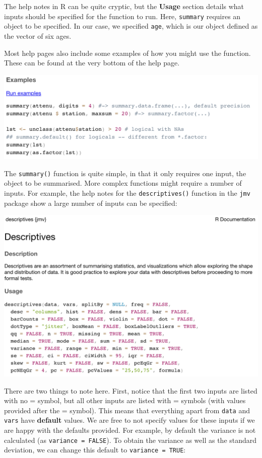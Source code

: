 \documentclass[
]{memoir}
\begin{document}
The help notes in R can be quite cryptic, but the \textbf{Usage} section details what inputs should be specified for the function to run. Here, \texttt{summary} requires an object to be specified. In our case, we specified \texttt{age}, which is our object defined as the vector of six ages.

Most help pages also include some examples of how you might use the function. These can be found at the very bottom of the help page.

\includegraphics[width=0.8\linewidth]{img/help-2}

The \texttt{summary()} function is quite simple, in that it only requires one input, the object to be summarised. More complex functions might require a number of inputs. For example, the help notes for the \texttt{descriptives()} function in the \texttt{jmv} package show a large number of inputs can be specified:

\includegraphics[width=0.8\linewidth]{img/help-3}

There are two things to note here. First, notice that the first two inputs are listed with no = symbol, but all other inputs are listed with = symbols (with values provided after the = symbol). This means that everything apart from \texttt{data} and \texttt{vars} have \textbf{default} values. We are free to not specify values for these inputs if we are happy with the defaults provided. For example, by default the variance is not calculated (as \texttt{variance\ =\ FALSE}). To obtain the variance as well as the standard deviation, we can change this default to \texttt{variance\ =\ TRUE}:
\end{document}

